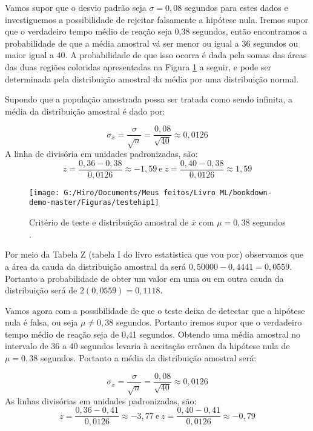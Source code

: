 \documentclass[
  openany]{book}
\begin{document}
Vamos supor que o desvio padrão seja \(\sigma=0,08\) segundos para estes dados e investiguemos a possibilidade de rejeitar falsamente a hipótese nula. Iremos supor que o verdadeiro tempo médio de reação seja 0,38 segundos, então encontramos a probabilidade de que a média amostral vá ser menor ou igual a 36 segundos ou maior igual a 40. A probabilidade de que isso ocorra é dada pela somas das áreas das duas regiões coloridas apresentadas na Figura \ref{fig:testehip1} a seguir, e pode ser determinada pela distribuição amostral da média por uma distribuição normal.

Supondo que a população amostrada possa ser tratada como sendo infinita, a média da distribuição amostral é dado por:

\[\sigma_{\overline{x}}=\frac{\sigma}{\sqrt{n}}=\frac{0,08}{\sqrt{40}}\approx 0,0126\]
A linha de divisória em unidades padronizadas, são:
\[z=\frac{0,36-0,38}{0,0126}\approx -1,59 \ \mbox{e} \ z=\frac{0,40-0,38}{0,0126}\approx 1,59\]

\begin{figure}

{\centering \texttt{[image: G:/Hiro/Documents/Meus feitos/Livro ML/bookdown-demo-master/Figuras/testehip1]} 

}

\caption{Critério de teste e distribuição amostral de \(\overline{x}\) com \(\mu =0,38\) segundos \citep{freund2009estatistica}.}\label{fig:testehip1}
\end{figure}



Por meio da Tabela Z (tabela I do livro estatistica que vou por) observamos que a área da cauda da distribuição amostral da será \(0,50000-0,4441=0,0559\). Portanto a probabilidade de obter um valor em uma ou em outra cauda da distribuição será de \(2(0,0559)=0,1118\).

Vamos agora com a possibilidade de que o teste deixa de detectar que a hipótese nula é falsa, ou seja \(\mu \neq 0,38\) segundos. Portanto iremos supor que o verdadeiro tempo médio de reação seja de 0,41 segundos. Obtendo uma média amostral no intervalo de 36 a 40 segundos levaria à aceitação errônea da hipótese nula de \(\mu=0,38\) segundos. Portanto a média da distribuição amostral será:

\[\sigma_{\overline{x}}=\frac{\sigma}{\sqrt{n}}=\frac{0,08}{\sqrt{40}}\approx 0,0126\]
As linhas divisórias em unidades padronizadas, são:
\[z=\frac{0,36-0,41}{0,0126}\approx -3,77 \ \mbox{e} \ z=\frac{0,40-0,41}{0,0126}\approx -0,79\]
\end{document}

